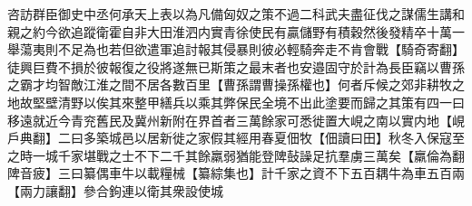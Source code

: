 咨訪群臣御史中丞何承天上表以為凡備匈奴之策不過二科武夫盡征伐之謀儒生講和親之約今欲追蹤衛霍自非大田淮泗内實青徐使民有贏儲野有積穀然後發精卒十萬一舉蕩夷則不足為也若但欲遣軍追討報其侵暴則彼必輕騎奔走不肯會戰【騎奇寄翻】徒興巨費不損於彼報復之役將遂無已斯策之最末者也安邉固守於計為長臣竊以曹孫之霸才均智敵江淮之間不居各數百里【曹孫謂曹操孫權也】何者斥候之郊非耕牧之地故堅壁清野以俟其來整甲繕兵以乘其弊保民全境不出此塗要而歸之其策有四一曰移遠就近今青兖舊民及冀州新附在界首者三萬餘家可悉徙置大峴之南以實内地【峴戶典翻】二曰多築城邑以居新徙之家假其經用春夏佃牧【佃讀曰田】秋冬入保寇至之時一城千家堪戰之士不下二千其餘羸弱猶能登陴鼔譟足抗羣虜三萬矣【羸倫為翻陴音疲】三曰纂偶車牛以載糧械【纂綜集也】計千家之資不下五百耦牛為車五百兩【兩力讓翻】參合鉤連以衛其衆設使城